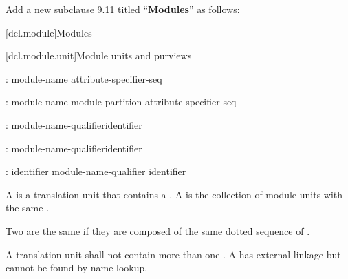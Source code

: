 \noindent
Add a new subclause 9.11 titled ``\textbf{Modules}'' as follows:

\setcounter{section}{10}
[dcl.module]{Modules}%

[dcl.module.unit]{Module units and purviews}

\begin{std.txt}\color{addclr}
\begin{before}\color{addclr}
\begin{bnf}
:\br
   \opt{}  module-name attribute-specifier-seq\opt{} \terminal{;}
\end{bnf}
\end{before}\begin{after}\color{addclr}
\begin{bnf}
:\br
   \opt{}  module-name module-partition\opt{} attribute-specifier-seq\opt{} \terminal{;}
\end{bnf}
\end{after}
  
  \begin{bnf}\color{addclr}
    :\br
      module-name-qualifier\opt identifier
  \end{bnf}
  
  \begin{after}
  \begin{bnf}\color{addclr}
    :\br
      \terminal{:} module-name-qualifier\opt identifier
  \end{bnf}
  \end{after}
  
  \begin{bnf}\color{addclr}
    :\br
      identifier \br
      module-name-qualifier identifier 
  \end{bnf}
  
  \resetalinea[0]
\alinea A  is a translation unit that contains
a . A  is the
collection of module units with the same .
\begin{after}\color{addclr}
Two  are the same if they are
composed of the same dotted sequence of .
\end{after}
\begin{before}\color{addclr}
A translation unit shall not contain more than
one .
A 
has external linkage but cannot be found by name lookup.
\end{before}


\end{std.txt}

